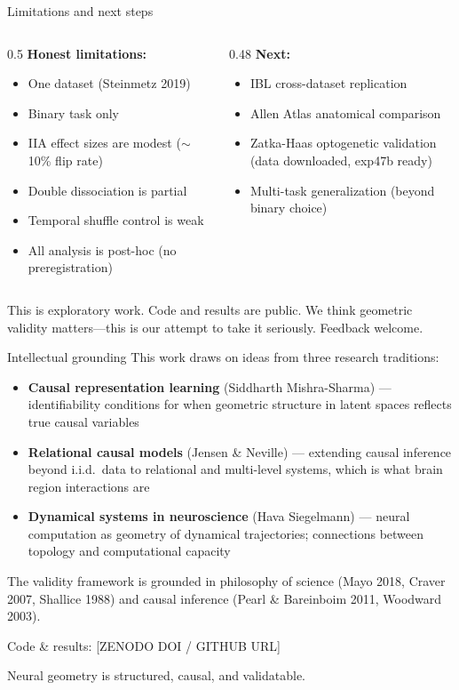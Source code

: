 \documentclass[aspectratio=169,11pt]{beamer}
\begin{document}
\begin{frame}{Limitations and next steps}
\begin{columns}[T]
\begin{column}{0.5\textwidth}
\textbf{Honest limitations:}
\begin{itemize}
  \item One dataset (Steinmetz 2019)
  \item Binary task only
  \item IIA effect sizes are modest ($\sim$10\% flip rate)
  \item Double dissociation is partial
  \item Temporal shuffle control is weak
  \item All analysis is post-hoc (no preregistration)
\end{itemize}
\end{column}
\begin{column}{0.48\textwidth}
\textbf{Next:}
\begin{itemize}
  \item IBL cross-dataset replication
  \item Allen Atlas anatomical comparison
  \item Zatka-Haas optogenetic validation \\
    {\small (data downloaded, exp47b ready)}
  \item Multi-task generalization (beyond binary choice)
\end{itemize}
\end{column}
\end{columns}

\vspace{1em}
This is exploratory work. Code and results are public. We think geometric validity matters---this is our attempt to take it seriously. Feedback welcome.
\end{frame}

\begin{frame}{Intellectual grounding}
This work draws on ideas from three research traditions:

\vspace{0.5em}
\begin{itemize}
  \item \textbf{Causal representation learning} (Siddharth Mishra-Sharma) --- identifiability conditions for when geometric structure in latent spaces reflects true causal variables
  \item \textbf{Relational causal models} (Jensen \& Neville) --- extending causal inference beyond i.i.d.\ data to relational and multi-level systems, which is what brain region interactions are
  \item \textbf{Dynamical systems in neuroscience} (Hava Siegelmann) --- neural computation as geometry of dynamical trajectories; connections between topology and computational capacity
\end{itemize}

\vspace{0.5em}
The validity framework is grounded in philosophy of science (Mayo 2018, Craver 2007, Shallice 1988) and causal inference (Pearl \& Bareinboim 2011, Woodward 2003).
\end{frame}

\begin{frame}[standout]
  Code \& results: {\small [ZENODO DOI / GITHUB URL]}

  \vspace{1em}
  Neural geometry is structured, causal, and validatable.
\end{frame}
\end{document}
